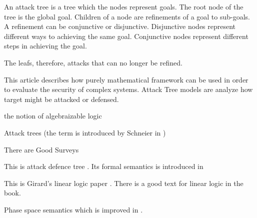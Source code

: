 


An attack tree is a tree which the nodes represent goals.
The root node  of the tree  is the global goal.
Children of a  node are refinements of  a goal to sub-goals.
A refinement can be  conjunctive or disjunctive.
Disjunctive nodes represent different ways to achieving the same goal.
Conjunctive nodes represent different steps in achieving the goal.

The leafs,  therefore,  attacks that can no longer be refined. 


%  


This article describes how purely mathematical framework can be used
in order to evaluate the security of complex systems. 
Attack Tree models are 
analyze how target might be attacked or defensed. 

the notion of algebraizable logic \cite{sep-consequence-algebraic}



Attack trees (the term is introduced by Schneier in \cite{Schneier:1999:AT}) 

There are Good Surveys \cite{DBLP:journals/corr/abs-1303-7397}


This is attack defence tree \cite{KoMaRaSc2}.  Its formal semantics is introduced in  \cite{DBLP:conf/ifip1-7/KordyMRS10}


This is Girard's linear logic paper \cite{Girard88book}.
There is a good text for linear logic  in the book\cite{Troelstra92}.


Phase space semantics \cite{Girard87tcs} which is improved in  \cite{Girard95a}.



